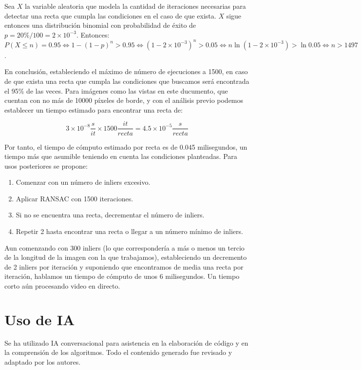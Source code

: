 \documentclass[11pt,a4paper]{article}
\begin{document}
Sea $X$ la variable aleatoria que modela la cantidad de iteraciones necesarias para detectar una recta que 
cumpla las condiciones en el caso de que exista. $X$ sigue entonces una distribución binomial con probabilidad 
de éxito de $p=20\%/100 = 2\times 10^{-3}$. Entonces:
$P(X\leq n)=0.95 \Leftrightarrow 1-(1-p)^n > 0.95 \Leftrightarrow (1-2\times 10^{-3})^n > 0.05 \Leftrightarrow n\ln{(1-2\times 10^{-3})} > \ln{0.05} \Leftrightarrow n>1497$.

En conclusión, estableciendo el máximo de número de ejecuciones a 1500, en caso de que exista una recta que cumpla 
las condiciones que buscamos será encontrada el 95\% de las veces.
Para imágenes como las vistas en este ducumento, que cuentan con no más de 10000 píxeles de borde, 
y con el análisis previo podemos establecer un tiempo estimado para encontrar una recta de:

$$
3\times 10^{-8}\frac{s}{it}\times 1500 \frac{it}{recta} = 4.5\times 10^{-5} \frac{s}{recta}
$$

Por tanto, el tiempo de cómputo estimado por recta es de 0.045 milisegundos, un tiempo más que asumible
 teniendo en cuenta las condiciones planteadas. Para usos posteriores se propone:
\begin{enumerate}
    \item Comenzar con un número de inliers excesivo.
    \item Aplicar RANSAC con 1500 iteraciones.
    \item Si no se encuentra una recta, decrementar el número de inliers.
    \item Repetir 2 hasta encontrar una recta o llegar a un número mínimo de inliers.
\end{enumerate}

Aun comenzando con 300 inliers (lo que correspondería a más o menos un tercio de la longitud
 de la imagen con la que trabajamos), estableciendo un decremento de 2 inliers por iteración y
  suponiendo que encontramos de media una recta por iteración, hablamos un tiempo de cómputo de
   unos 6 milisegundos. Un tiempo corto aún procesando video en directo.

\clearpage

\section*{Uso de IA}

Se ha utilizado IA conversacional para asistencia en la elaboración de código y en la comprensión de los algoritmos. Todo el contenido generado fue revisado y adaptado por los autores.



\end{document}

